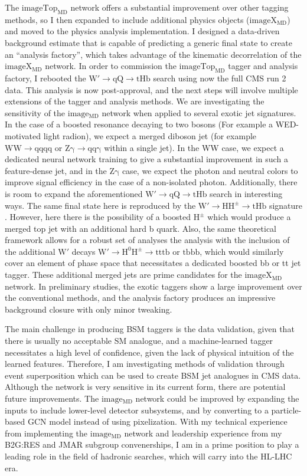 \documentclass[12pt]{article}
\begin{document}
The $\mathrm{imageTop_{MD}}$ network offers a substantial improvement over other tagging
methods, so I then expanded to include additional physics objects ($\mathrm{imageX_{MD}}$) and
moved to the physics analysis implementation.  I designed a data-driven background estimate
that is capable of predicting a generic final state to create an ``analysis factory'',
which takes advantage of the kinematic decorrelation of the $\mathrm{imageX_{MD}}$ network.  In order
to commission the $\mathrm{imageTop_{MD}}$ tagger and analysis factory, I rebooted
the $\mathrm{W' \to qQ \to tHb}$ search using now the full CMS run 2 data. This analysis
is now post-approval, and the next steps will involve multiple extensions of the tagger and
analysis methods.  We are investigating the sensitivity of the $\mathrm{image_{MD}}$ network when applied to several
exotic jet signatures.  In the case of a boosted resonance decaying to two bosons (For example a WED-motivated light radion),
we expect a merged diboson jet (for example $\mathrm{WW \to qqqq}$ or $\mathrm{Z\gamma \to qq\gamma}$ within a single jet).
In the WW case, we expect a dedicated neural network training to give a substantial improvement in
such a feature-dense jet, and in the $\mathrm{Z\gamma}$ case, we expect the photon and neutral colors to improve signal efficiency in the case of a non-isolated
photon.  Additionally, there is room to expand the aforementioned
$\mathrm{W' \to qQ \to tHb}$ search in interesting ways.  The same final state here is
reproduced by the $\mathrm{W' \to HH^{\pm} \to tHb}$ signature \cite{Dobrescu:2015yba}.
However, here there is the possibility of a boosted $\mathrm{H^{\pm}}$ which would produce a
merged top jet with an additional hard b quark.
Also, the same theoretical framework allows for a robust set of analyses the
analysis with the inclusion of the additional $\mathrm{W'}$ decays
$\mathrm{W' \to H^{0}H^{\pm} \to tttb}$ or $\mathrm{tbbb}$, which would similarly cover an element of phase space
that necessitates a dedicated boosted bb or tt jet tagger.
These additional merged jets are prime candidates for the $\mathrm{imageX_{MD}}$
network.  In preliminary studies, the exotic taggers show a large improvement over the
conventional methods, and the analysis factory produces an impressive background
closure with only minor tweaking.

The main challenge in producing BSM taggers is the data validation, given that there
is usually no acceptable SM analogue, and a machine-learned tagger necessitates a
high level of confidence, given the lack of physical intuition of the learned features.
Therefore, I am investigating methods of validation through event superposition
which can be used to create BSM jet analogues in CMS data.  Although the network is
very sensitive in its current form, there are potential future improvements.
The $\mathrm{image_{MD}}$ network could be improved by expanding the inputs to
include lower-level detector subsystems, and by converting to a particle-based GCN model instead of using pixelization.  With my technical experience from implementing the
$\mathrm{image_{MD}}$ network and leadership experience from my
B2G:RES and JMAR subgroup convenerships, I am in a prime position to play a leading role in the
field of hadronic searches, which will carry into the HL-LHC era.
\end{document}
